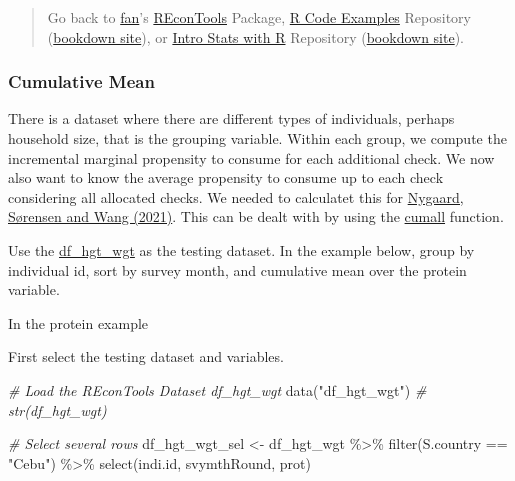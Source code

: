 \documentclass[
]{book}
\newenvironment{Shaded}{\begin{snugshade}}{\end{snugshade}}
\newcommand{\CommentTok}[1]{\textcolor[rgb]{0.56,0.35,0.01}{\textit{#1}}}
\newcommand{\FunctionTok}[1]{\textcolor[rgb]{0.00,0.00,0.00}{#1}}
\newcommand{\NormalTok}[1]{#1}
\newcommand{\OtherTok}[1]{\textcolor[rgb]{0.56,0.35,0.01}{#1}}
\newcommand{\SpecialCharTok}[1]{\textcolor[rgb]{0.00,0.00,0.00}{#1}}
\newcommand{\StringTok}[1]{\textcolor[rgb]{0.31,0.60,0.02}{#1}}
\begin{document}
\begin{quote}
Go back to \href{http://fanwangecon.github.io/}{fan}'s \href{https://fanwangecon.github.io/REconTools/}{REconTools} Package, \href{https://fanwangecon.github.io/R4Econ/}{R Code Examples} Repository (\href{https://fanwangecon.github.io/R4Econ/bookdown}{bookdown site}), or \href{https://fanwangecon.github.io/Stat4Econ/}{Intro Stats with R} Repository (\href{https://fanwangecon.github.io/Stat4Econ/bookdown}{bookdown site}).
\end{quote}

\hypertarget{cumulative-mean}{%
\subsubsection{Cumulative Mean}\label{cumulative-mean}}

There is a dataset where there are different types of individuals, perhaps household size, that is the grouping variable. Within each group, we compute the incremental marginal propensity to consume for each additional check. We now also want to know the average propensity to consume up to each check considering all allocated checks. We needed to calculatet this for \href{https://papers.ssrn.com/sol3/papers.cfm?abstract_id=3691091}{Nygaard, Sørensen and Wang (2021)}. This can be dealt with by using the \href{https://dplyr.tidyverse.org/reference/cumall.html}{cumall} function.

Use the \href{https://fanwangecon.github.io/REconTools/reference/df_hgt_wgt.html}{df\_hgt\_wgt} as the testing dataset. In the example below, group by individual id, sort by survey month, and cumulative mean over the protein variable.

In the protein example

First select the testing dataset and variables.

\begin{Shaded}
\begin{Highlighting}[]
\CommentTok{\# Load the REconTools Dataset df\_hgt\_wgt}
\FunctionTok{data}\NormalTok{(}\StringTok{"df\_hgt\_wgt"}\NormalTok{)}
\CommentTok{\# str(df\_hgt\_wgt)}

\CommentTok{\# Select several rows}
\NormalTok{df\_hgt\_wgt\_sel }\OtherTok{\textless{}{-}}\NormalTok{ df\_hgt\_wgt }\SpecialCharTok{\%\textgreater{}\%} 
  \FunctionTok{filter}\NormalTok{(S.country }\SpecialCharTok{==} \StringTok{"Cebu"}\NormalTok{) }\SpecialCharTok{\%\textgreater{}\%}
  \FunctionTok{select}\NormalTok{(indi.id, svymthRound, prot)}
\end{Highlighting}
\end{Shaded}
\end{document}
